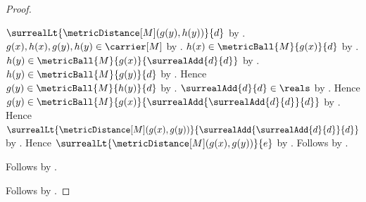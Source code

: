 \begin{proof}
\begin{subproof}
\begin{subproof}
                $\surrealLt{\metricDistance[M](g(y),h(y))}{d}$
                by \auto.
            $g(x),h(x),g(y),h(y)\in\carrier[M]$
                by .
            $h(x)\in\metricBall{M}{g(x)}{d}$
                by .
            $h(y)\in\metricBall{M}{g(x)}{\surrealAdd{d}{d}}$
                by .
            $h(y)\in\metricBall{M}{g(y)}{d}$
                by .
            Hence $g(y)\in\metricBall{M}{h(y)}{d}$
                by .
            $\surrealAdd{d}{d}\in\reals$
                by .
            Hence $g(y)\in\metricBall{M}{g(x)}
                {\surrealAdd{\surrealAdd{d}{d}}{d}}$
                by .
            Hence
                $\surrealLt{\metricDistance[M](g(x),g(y))}
                    {\surrealAdd{\surrealAdd{d}{d}}{d}}$
                by .
            Hence $\surrealLt{\metricDistance[M](g(x),g(y))}{e}$
                by
                .
            Follows by .
        \end{subproof}
        Follows by \auto.
    \end{subproof}
    Follows by .
\end{proof}
